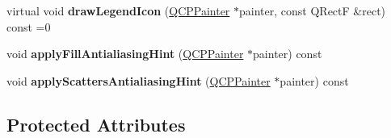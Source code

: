 \begin{DoxyCompactItemize}
virtual void {\bfseries draw\+Legend\+Icon} (\hyperlink{class_q_c_p_painter}{Q\+C\+P\+Painter} $\ast$painter, const Q\+RectF \&rect) const =0
\item 
\mbox{\label{class_q_c_p_abstract_plottable_a8d06a59ea23324cce6330ebf2262c0ed}} 
void {\bfseries apply\+Fill\+Antialiasing\+Hint} (\hyperlink{class_q_c_p_painter}{Q\+C\+P\+Painter} $\ast$painter) const
\item 
\mbox{\label{class_q_c_p_abstract_plottable_ac95f26b15a1e5d9c7bd2c0a46d760fc9}} 
void {\bfseries apply\+Scatters\+Antialiasing\+Hint} (\hyperlink{class_q_c_p_painter}{Q\+C\+P\+Painter} $\ast$painter) const
\end{DoxyCompactItemize}
\subsection*{Protected Attributes}
